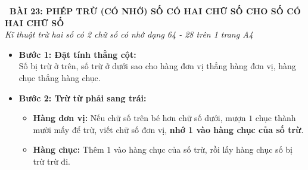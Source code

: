 \documentclass[11pt,a4paper]{article}
\begin{document}
\begin{tcolorbox}[
  enhanced,
  colback=violet!8!white,
  colframe=violet!70!black,
  arc=3mm, boxrule=1.2pt,
  left=3mm, right=3mm, top=2mm, bottom=2mm,
  halign=center
]
  {\LARGE\bfseries\color{violet!90!black}\faBookmark\ BÀI 23: PHÉP TRỪ (CÓ NHỚ) SỐ CÓ HAI CHỮ SỐ CHO SỐ CÓ HAI CHỮ SỐ}\\[1mm]
  {\itshape\footnotesize\color{black!75} Kĩ thuật trừ hai số có 2 chữ số có nhớ dạng 64 - 28 trên 1 trang A4}
\end{tcolorbox}

\vspace{-2mm}

\noindent
\begin{minipage}[t]{0.49\textwidth}\vspace{0pt}
\begin{tcolorbox}[
  enhanced,
  colback=violet!4!white,
  colframe=violet!75!black,
  arc=2mm, boxrule=0.8pt,
  left=2mm, right=2mm, top=1.8mm, bottom=1.8mm,
  title={\footnotesize\bfseries\color{white}\faKey\ 1. Quy tắc trừ 2 chữ số có nhớ}
]
{\footnotesize
\begin{itemize}\setlength{\itemsep}{1pt}\setlength{\leftskip}{-2.5mm}
  \item \textbf{Bước 1: Đặt tính thẳng cột:}\\
  Số bị trừ ở trên, số trừ ở dưới sao cho hàng đơn vị thẳng hàng đơn vị, hàng chục thẳng hàng chục.
  \item \textbf{Bước 2: Trừ từ phải sang trái:}
  \begin{itemize}\setlength{\itemsep}{0.5pt}\setlength{\leftskip}{-2.5mm}
    \item \textbf{Hàng đơn vị:} Nếu chữ số trên bé hơn chữ số dưới, mượn $1$ chục thành mười mấy để trừ, viết chữ số đơn vị, \textbf{nhớ 1 vào hàng chục của số trừ}.
    \item \textbf{Hàng chục:} Thêm $1$ vào hàng chục của số trừ, rồi lấy hàng chục số bị trừ trừ đi.
  \end{itemize}
\end{itemize}
}
\end{tcolorbox}
\end{minipage}
\hfill
\end{document}
